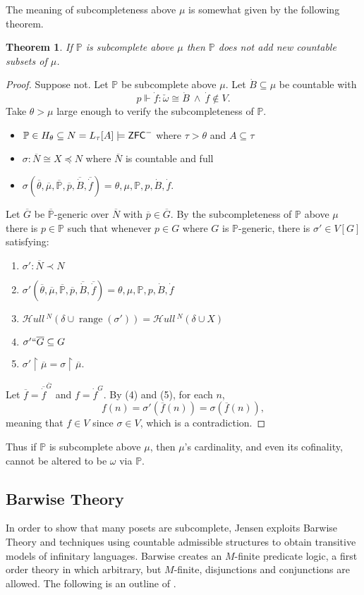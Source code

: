 \documentclass{amsart}
\newtheorem{theorem}{Theorem}[section]
\theoremstyle{definition}
\theoremstyle{remark}
\renewcommand{\P}{\mathbb{P}}
\newcommand{\N}{{\overline{N}}}
\newcommand{\G}{\overline{G}}
\newcommand{\ZFC}{\textup{\ensuremath{\textsf{ZFC}}}}
\DeclareMathOperator{\ran}{range}
\newcommand{\forces}{\Vdash}
\newcommand{\rest}{\mathbin{\upharpoonright}}
\newcommand{\SH}{\mathcal{H}\textit{ull} \,}
\newcommand{\sk}[3]{\SH^{#1}( {#2} \cup {\ran(#3)} ) }
\newcommand{\Sk}[3]{\SH^{#1}( {#2} \cup {#3} ) }
\begin{document}
The meaning of subcompleteness above $\mu$ is somewhat given by the following theorem.
\begin{theorem} If $\P$ is subcomplete above $\mu$ then $\P$ does not add new countable subsets of $\mu$. \end{theorem}
\begin{proof}
Suppose not. Let $\P$ be subcomplete above $\mu$. Let $\dot B \subseteq \mu$ be countable with 
	$$p \forces \dot f: \check \omega \cong \dot B \ \land\ \dot f \notin V.$$ 
Take $\theta > \mu$ large enough to verify the subcompleteness of $\P$. \begin{itemize}
	\item $\P \in H_\theta \subseteq N = L_\tau[A] \models \ZFC^-$ where $\tau>\theta$ and $A \subseteq \tau$
	\item $\sigma: \N \cong X \preccurlyeq N$ where $\N$ is countable and full
	\item $\sigma(\overline \theta, \overline \mu, \overline{\P}, \overline p, \overline{\dot B}, \overline{\dot f})=\theta, \mu, \P, p, \dot B, \dot f$.
\end{itemize}
Let $\G$ be $\overline{\P}$-generic over $\N$ with $\overline p \in \overline G$. By the subcompleteness of $\P$ above $\mu$ there is $p \in \P$ such that whenever $p \in G$ where $G$ is $\P$-generic, there is $\sigma' \in V[G]$ satisfying: \begin{enumerate}
	\item $\sigma': \N \prec N$
	\item $\sigma'(\overline \theta, \overline \mu, \overline{\P}, \overline p, \overline{\dot B}, \overline{\dot f})=\theta, \mu, \P, p, \dot B, \dot f$
	\item $\sk{N}{\delta}{\sigma'} = \Sk{N}{\delta}{X}$
	\item $\sigma'``\G \subseteq G$
	\item $\sigma' \rest \overline \mu = \sigma \rest \overline \mu$.
\end{enumerate}
Let $\overline f = \overline{\dot f}^{\G}$ and $f = \dot f^G$. By (4) and (5), for each $n$, $$f(n)=\sigma'(\overline f(n)) = \sigma(\overline f(n)),$$ meaning that $f \in V$ since $\sigma \in V$, which is a contradiction.
\end{proof}
Thus if $\P$ is subcomplete above $\mu$, then $\mu$'s cardinality, and even its cofinality, cannot be altered to be $\omega$ via $\P$.



\subsection{Barwise Theory}
\label{subsec:BarwiseTheory}
In order to show that many posets are subcomplete, Jensen exploits Barwise Theory and techniques using countable admissible structures to obtain transitive models of infinitary languages. Barwise creates an $M$-finite predicate logic, a first order theory in which arbitrary, but $M$-finite, disjunctions and conjunctions are allowed. The following is an outline of \cite[Chapter 1 \& 2]{Jensen:2012fr}. 
\end{document}
